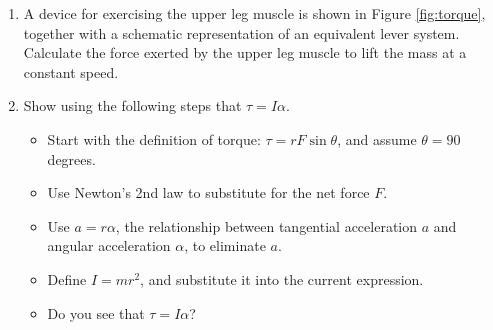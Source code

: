 \documentclass{article}
\begin{document}
\begin{enumerate}
\item A device for exercising the upper leg muscle is shown in Figure \ref{fig:torque}, together with a schematic representation of an equivalent lever system. Calculate the force exerted by the upper leg muscle to lift the mass at a constant speed. \\ \vspace{2cm}
\item Show using the following steps that $\tau = I \alpha$.
\begin{itemize}
\item Start with the definition of torque: $\tau = r F \sin\theta$, and assume $\theta = 90$ degrees.
\item Use Newton's 2nd law to substitute for the net force $F$.
\item Use $a = r\alpha$, the relationship between tangential acceleration $a$ and angular acceleration $\alpha$, to eliminate $a$.
\item Define $I = mr^2$, and substitute it into the current expression.
\item Do you see that $\tau = I \alpha$?
\end{itemize}
\end{enumerate}
\end{document}
